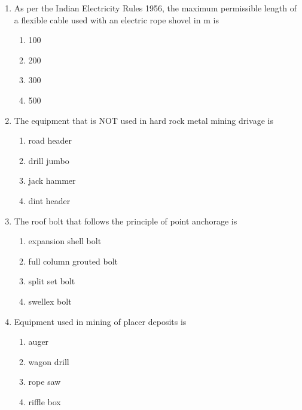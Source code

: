 \documentclass[journal]{IEEEtran}
\begin{document}
\begin{enumerate}[leftmargin=0pt]
\item As per the Indian Electricity Rules 1956, the maximum permissible length of a flexible cable used
with an electric rope shovel in m is
\begin{multicols}{2}
\begin{enumerate}[label=(\Alph*), itemsep=0pt, topsep=2pt]
  \item 100
  \item 200
  \item 300
  \item 500
\end{enumerate}
\end{multicols}
\hfill{}
\item The equipment that is NOT used in hard rock metal mining drivage is
\begin{multicols}{2}
\begin{enumerate}[label=(\Alph*), itemsep=0pt, topsep=2pt]
  \item road header
  \item drill jumbo
  \item jack hammer
  \item dint header
\end{enumerate}
\end{multicols}
\hfill{}

\item The roof bolt that follows the principle of point anchorage is
\begin{multicols}{2}
\begin{enumerate}[label=(\Alph*), itemsep=0pt, topsep=2pt]
  \item expansion shell bolt
  \item full column grouted bolt
  \item split set bolt
  \item swellex bolt
\end{enumerate}
\end{multicols}
\hfill{}

\item Equipment used in mining of placer deposits is
\begin{multicols}{2}
\begin{enumerate}[label=(\Alph*), itemsep=0pt, topsep=2pt]
  \item auger
  \item wagon drill
  \item rope saw
  \item riffle box
\end{enumerate}
\end{multicols}
\hfill{}


\end{enumerate}
\end{document}
